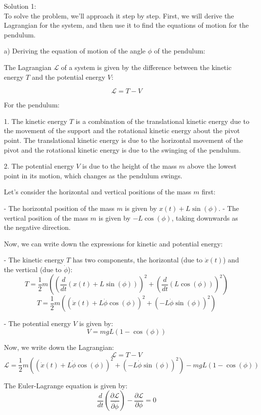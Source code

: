 \documentclass[a4paper,11pt]{article}
\begin{document}
\noindent Solution 1: \\

To solve the problem, we'll approach it step by step. First, we will derive the Lagrangian for the system, and then use it to find the equations of motion for the pendulum.

a) Deriving the equation of motion of the angle \( \phi \) of the pendulum:

The Lagrangian \( \mathcal{L} \) of a system is given by the difference between the kinetic energy \( T \) and the potential energy \( V \):

\[ \mathcal{L} = T - V \]

For the pendulum:

1. The kinetic energy \( T \) is a combination of the translational kinetic energy due to the movement of the support and the rotational kinetic energy about the pivot point. The translational kinetic energy is due to the horizontal movement of the pivot and the rotational kinetic energy is due to the swinging of the pendulum.

2. The potential energy \( V \) is due to the height of the mass \( m \) above the lowest point in its motion, which changes as the pendulum swings.

Let's consider the horizontal and vertical positions of the mass \( m \) first:

- The horizontal position of the mass \( m \) is given by \( x(t) + L \sin(\phi) \).
- The vertical position of the mass \( m \) is given by \( -L \cos(\phi) \), taking downwards as the negative direction.

Now, we can write down the expressions for kinetic and potential energy:

- The kinetic energy \( T \) has two components, the horizontal (due to \( \dot{x}(t) \)) and the vertical (due to \( \dot{\phi} \)):
\[ T = \frac{1}{2}m\left( \left(\frac{d}{dt}(x(t) + L \sin(\phi))\right)^2 + \left(\frac{d}{dt}(L \cos(\phi))\right)^2 \right) \]
\[ T = \frac{1}{2}m\left( \left(\dot{x}(t) + L\dot{\phi}\cos(\phi)\right)^2 + \left(-L\dot{\phi}\sin(\phi)\right)^2 \right) \]

- The potential energy \( V \) is given by:
\[ V = mgL(1 - \cos(\phi)) \]

Now, we write down the Lagrangian:
\[ \mathcal{L} = T - V \]
\[ \mathcal{L} = \frac{1}{2}m\left( \left(\dot{x}(t) + L\dot{\phi}\cos(\phi)\right)^2 + \left(-L\dot{\phi}\sin(\phi)\right)^2 \right) - mgL(1 - \cos(\phi)) \]

The Euler-Lagrange equation is given by:
\[ \frac{d}{dt}\left(\frac{\partial \mathcal{L}}{\partial \dot{\phi}}\right) - \frac{\partial \mathcal{L}}{\partial \phi} = 0 \]
\end{document}
